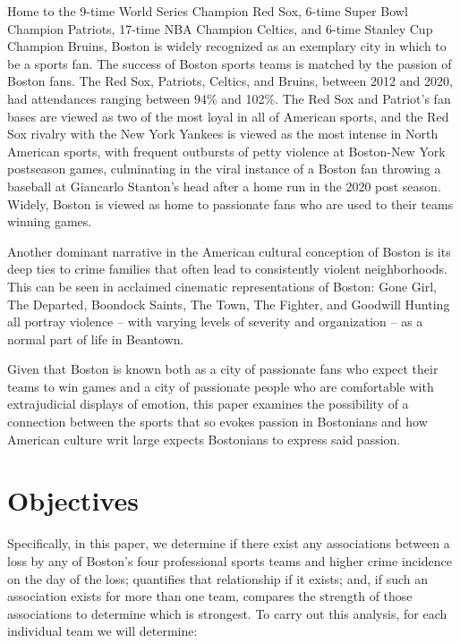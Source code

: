 \documentclass{article}
\begin{document}
Home to the 9-time World Series Champion Red Sox, 6-time Super Bowl Champion Patriots, 17-time NBA Champion Celtics, and 6-time Stanley Cup Champion Bruins, Boston is widely recognized as an exemplary city in which to be a sports fan. The success of Boston sports teams is matched by the passion of Boston fans. The Red Sox, Patriots, Celtics, and Bruins, between 2012 and 2020, had attendances ranging between 94\% and 102\%. The Red Sox and Patriot's fan bases are viewed as two of the most loyal in all of American sports, and the Red Sox rivalry with the New York Yankees is viewed as the most intense in North American sports, with frequent outbursts of petty violence at Boston-New York postseason games, culminating in the viral instance of a Boston fan throwing a baseball at Giancarlo Stanton's head after a home run in the 2020 post season. Widely, Boston is viewed as home to passionate fans who are used to their teams winning games. \newline

Another dominant narrative in the American cultural conception of Boston is its deep ties to crime families that often lead to consistently violent neighborhoods. This can be seen in acclaimed cinematic representations of Boston: Gone Girl, The Departed, Boondock Saints, The Town, The Fighter, and Goodwill Hunting all portray violence -- with varying levels of severity and organization -- as a normal part of life in Beantown. \newline

Given that Boston is known both as a city of passionate fans who expect their teams to win games and a city of passionate people who are comfortable with extrajudicial displays of emotion, this paper examines the possibility of a connection between the sports that so evokes passion in Bostonians and how American culture writ large expects Bostonians to express said passion. \newline

\section{Objectives}
Specifically, in this paper, we determine if there exist any associations between a loss by any of Boston's four professional sports teams and higher crime incidence on the day of the loss; quantifies that relationship if it exists; and, if such an association exists for more than one team, compares the strength of those associations to determine which is strongest. To carry out this analysis, for each individual team we will determine:
\end{document}
